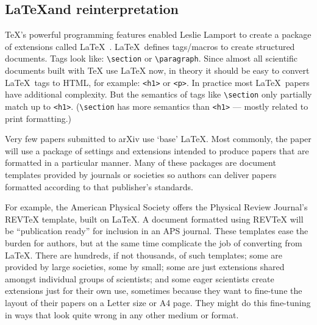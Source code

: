 \documentclass{easychair}
\begin{document}
\subsection{\LaTeX and reinterpretation}
\label{sect:LaTeX and reinterpretation}

\TeX’s powerful programming features enabled Leslie Lamport to create a package of extensions called \LaTeX~\cite{mittelbach23:latex}. \LaTeX\ defines tags/macros to create structured documents. Tags look like: \verb |\section| or \verb |\paragraph|. Since almost all scientific documents built with TeX use LaTeX now, in theory it should be easy to convert \LaTeX\ tags to HTML, for example: \verb |<h1>| or \verb |<p>|. In practice most \LaTeX\ papers have additional complexity. But the semantics of tags like \verb |\section| only partially match up to \verb |<h1>|. (\verb |\section| has more semantics than \verb |<h1>| --- mostly related to print formatting.) 

Very few papers submitted to arXiv use `base' \LaTeX.  Most commonly, the paper will use a package of settings and extensions intended to produce papers that are formatted in a particular manner.  Many of these packages are document templates provided by journals or societies so authors can deliver papers formatted according to that publisher's standards.

For example, the American Physical Society offers the Physical Review Journal's REVTeX template, built on \LaTeX. A document formatted using REVTeX will be ``publication ready'' for inclusion in an APS journal. These templates ease the burden for authors, but at the same time complicate the job of converting from \LaTeX. There are hundreds, if not thousands, of such templates; some are provided by large societies, some by small; some are just extensions shared amongst individual groups of scientists; and some eager scientists create extensions just for their own use, sometimes because they want to fine-tune the layout of their papers on a Letter size or A4 page. They might do this fine-tuning in ways that look quite wrong in any other medium or format.
\end{document}
